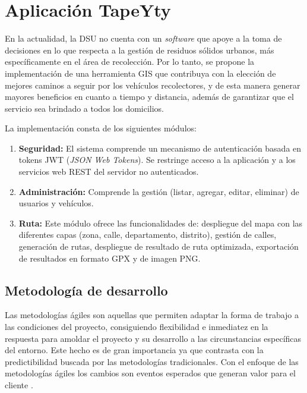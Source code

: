 \chapter{Aplicación TapeYty}
\label{solucionpropuesta}
\ifpdf
  \graphicspath{{Chapter6/Chapter6Figs/PNG/}{Chapter6/Chapter6Figs/PDF/}{Chapter6/Chapter6Figs/}}
\else
  \graphicspath{{Chapter6/Chapter6Figs/EPS/}{Chapter6/Chapter6Figs/}}
\fi


En la actualidad, la DSU no cuenta con un \textit{software} que apoye a la toma de decisiones en lo que respecta a la gestión de residuos sólidos urbanos, más específicamente en el área de recolección. Por lo tanto, se propone la implementación de una herramienta GIS que contribuya con la elección de mejores caminos a seguir por los vehículos recolectores, y de esta manera generar mayores beneficios en cuanto a tiempo y distancia, además de garantizar que el servicio sea brindado a todos los domicilios.

La implementación consta de los siguientes módulos:
\begin{enumerate}
    \item \textbf{Seguridad:} El sistema comprende un mecanismo de autenticación basada en tokens JWT (\textit{JSON Web Tokens}). Se restringe acceso a la aplicación y a los servicios web REST del servidor no autenticados.
    \item \textbf{Administración:} Comprende la gestión (listar, agregar, editar, eliminar) de usuarios y vehículos.
    \item \textbf{Ruta:} Este módulo ofrece las funcionalidades de: despliegue del mapa con las diferentes capas (zona, calle, departamento, distrito), gestión de calles, generación de rutas, despliegue de resultado de ruta optimizada, exportación de resultados en formato GPX y de imagen PNG.
\end{enumerate}

\section{Metodología de desarrollo}

Las metodologías ágiles son aquellas que permiten adaptar la forma de trabajo a las condiciones del proyecto, consiguiendo flexibilidad e inmediatez en la respuesta para amoldar el proyecto y su desarrollo a las circunstancias específicas del entorno. Este hecho es de gran importancia ya que contrasta con la predictibilidad buscada por las metodologías tradicionales. Con el enfoque de las metodologías ágiles los cambios son eventos esperados que generan valor para el cliente \citep{Patel2012AMethods}.

